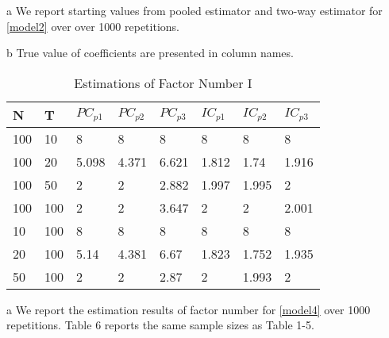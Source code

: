 \documentclass[a4paper]{article}
\begin{document}
\begin{table}[]
\begin{threeparttable}
\begin{tablenotes}
        \footnotesize
        \item[a] We report starting values from pooled estimator and two-way estimator for \eqref{model2} over over 1000 repetitions.
        \item[b] True value of coefficients are presented in column names.
      \end{tablenotes}
\end{threeparttable}

\end{table}



\begin{table}[]
\caption{\centering Estimations of Factor Number  I}
\label{table:table6}
\centering

\begin{threeparttable}

\begin{tabular}{l|l|l|l|l|l|l|l}
\hline
N   & T   & $PC_{p1}$ & $PC_{p2}$ & $PC_{p3}$ & $IC_{p1}$ & $IC_{p2}$ & $IC_{p3}$    \\ \hline
100 & 10  & 8     & 8     & 8     & 8     & 8     & 8     \\ \hline
100 & 20  & 5.098 & 4.371 & 6.621 & 1.812 & 1.74  & 1.916 \\ \hline
100 & 50  & 2     & 2     & 2.882 & 1.997 & 1.995 & 2     \\ \hline
100 & 100 & 2     & 2     & 3.647 & 2     & 2     & 2.001 \\ \hline
10  & 100 & 8     & 8     & 8     & 8     & 8     & 8     \\ \hline
20  & 100 & 5.14  & 4.381 & 6.67  & 1.823 & 1.752 & 1.935 \\ \hline
50  & 100 & 2     & 2     & 2.87  & 2     & 1.993 & 2     \\ \hline
\end{tabular}

\begin{tablenotes}
        \footnotesize
        \item[a]  We report the estimation results of factor number for \eqref{model4} over 1000 repetitions. Table 6 reports the same sample sizes as Table 1-5.
      \end{tablenotes}
\end{threeparttable}

\end{table}
\end{document}
